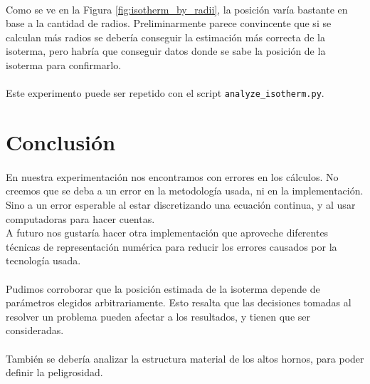 \documentclass[12pt]{article}
\begin{document}
\paragraph{} Como se ve en la Figura \ref{fig:isotherm_by_radii}, la posición varía bastante en base a la cantidad de radios. Preliminarmente parece convincente que si se calculan más radios se debería conseguir la estimación más correcta de la isoterma, pero habría que conseguir datos donde se sabe la posición de la isoterma para confirmarlo.

\paragraph{} Este experimento puede ser repetido con el script \texttt{analyze\_isotherm.py}.

\section{Conclusión}

\paragraph{} En nuestra experimentación nos encontramos con errores en los cálculos. No creemos que se deba a un error en la metodología usada, ni en la implementación. Sino a un error esperable al estar discretizando una ecuación continua, y al usar computadoras para hacer cuentas. \\
A futuro nos gustaría hacer otra implementación que aproveche diferentes técnicas de representación numérica para reducir los errores causados por la tecnología usada.
\paragraph{} Pudimos corroborar que la posición estimada de la isoterma depende de parámetros elegidos arbitrariamente. Esto resalta que las decisiones tomadas al resolver un problema pueden afectar a los resultados, y tienen que ser consideradas. 
\paragraph{} También se debería analizar la estructura material de los altos hornos, para poder definir la peligrosidad.
\end{document}
